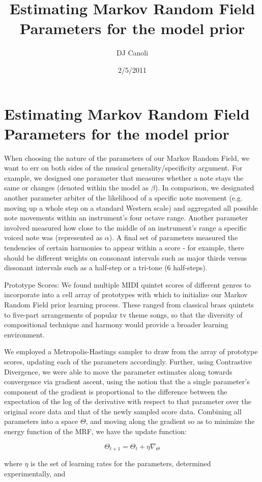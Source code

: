 \documentclass{article}
\title{Estimating Markov Random Field Parameters for the model prior}
\author{DJ Canoli}
\date{2/5/2011}
\begin{document}
\section{Estimating Markov Random Field Parameters for the model prior}

When choosing the nature of the parameters of our Markov Random Field, we want to err on both sides of the musical generality/specificity argument.  For example, we designed one parameter that measures whether a note stays the same or changes (denoted within the model as $\beta$).  In comparison, we designated another parameter arbiter of the likelihood of a specific note movement (e.g. moving up a whole step on a standard Western scale) and aggregated all possible note movements within an instrument's four octave range.  Another parameter involved measured how close to the middle of an instrument's range a specific voiced note was (represented as $\alpha$).  A final set of parameters measured the tendencies of certain harmonies to appear within a score - for example, there should be different weights on consonant intervals such as major thirds versus dissonant intervals such as a half-step or a tri-tone (6 half-steps).  

Prototype Scores:
We found multiple MIDI quintet scores of different genres to incorporate into a cell array of prototypes with which to initialize our Markov Random Field prior learning process.  These ranged from classical brass quintets to five-part arrangements of popular tv theme songs, so that the diversity of compositional technique and harmony would provide a broader learning environment.

We employed a Metropolis-Hastings sampler to draw from the array of prototype scores, updating each of the parameters accordingly.  Further, using Contrastive Divergence, we were able to move the parameter estimates along towards convergence via gradient ascent, using the notion that the a single parameter's component of the gradient is proportional to the difference between the expectation of the log of the derivative with respect to that parameter over the original score data and that of the newly sampled score data.  Combining all parameters into a space $\Theta$, and moving along the gradient so as to minimize the energy function of the MRF, we have the update function:

\[\Theta_{t+1} = \Theta_t + \eta\nabla_{\Theta}\]

where $\eta$ is the set of learning rates for the parameters, determined experimentally, and
\end{document}
